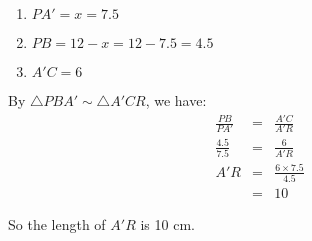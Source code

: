 \begin{enumerate}
    \item{ $ PA' = x = 7.5 $ }
    \item{ $ PB = 12 - x = 12 - 7.5 = 4.5 $ }
    \item{ $ A'C = 6 $ }
\end{enumerate}

By $ \triangle PBA' \sim \triangle A'CR $, we have:
\begin{eqnarray*}
   \frac{PB}{PA'} &=& \frac{A'C}{A'R}          \\
  \frac{4.5}{7.5} &=& \frac{6}{A'R}            \\
              A'R &=& \frac{6 \times 7.5}{4.5} \\
                  &=& 10
\end{eqnarray*}

So the length of $ A'R $ is 10 cm.
